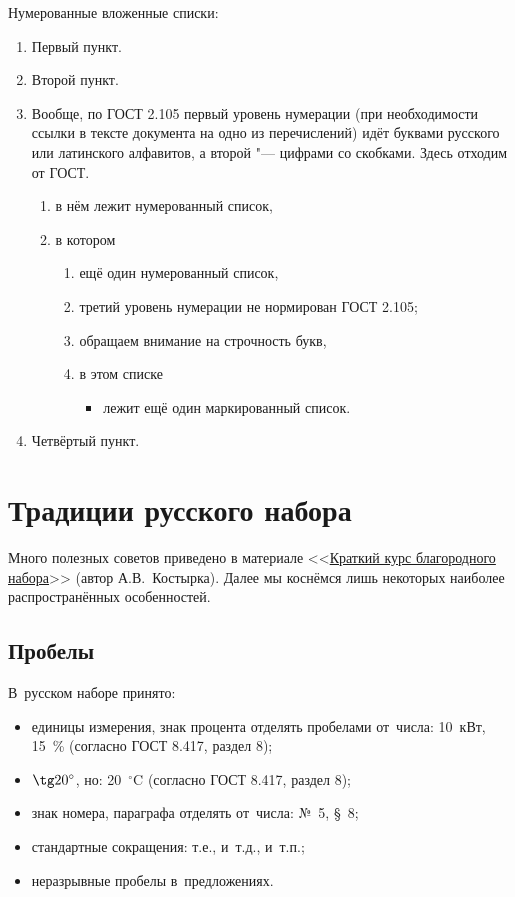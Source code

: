 \noindent Нумерованные вложенные списки:
\begin{enumerate}
  \item Первый пункт.
  \item Второй пункт.
  \item Вообще, по ГОСТ 2.105 первый уровень нумерации
  (при необходимости ссылки в тексте документа на одно из перечислений)
  идёт буквами русского или латинского алфавитов,
  а второй "--- цифрами со скобками.
  Здесь отходим от ГОСТ.
    \begin{enumerate}
      \item в нём лежит нумерованный список,
      \item в котором
        \begin{enumerate}
          \item ещё один нумерованный список,
          \item третий уровень нумерации не нормирован ГОСТ 2.105;
          \item обращаем внимание на строчность букв,
          \item в этом списке
          \begin{itemize}
            \item лежит ещё один маркированный список.
          \end{itemize}    
        \end{enumerate}

    \end{enumerate}

  \item Четвёртый пункт.
\end{enumerate}

\section{Традиции русского набора}

Много полезных советов приведено в материале
<<\href{http://www.dropbox.com/s/x4hajy4pkw3wdql/wholesome-typesetting.pdf?dl=1\&pv=1}{Краткий курс благородного набора}>> (автор А.\:В.~Костырка).
Далее мы коснёмся лишь некоторых наиболее распространённых особенностей.

\subsection{Пробелы}

В~русском наборе принято:
\begin{itemize}
    \item единицы измерения, знак процента отделять пробелами от~числа: 10~кВт, 15~\% (согласно ГОСТ 8.417, раздел 8);
    \item $\tg 20^\circ$, но: 20~${}^\circ$C (согласно ГОСТ 8.417, раздел 8);
    \item знак номера, параграфа отделять от~числа: №~5, \S~8;
    \item стандартные сокращения: т.\:е., и~т.\:д., и~т.\:п.;
    \item неразрывные пробелы в~предложениях.
\end{itemize}

